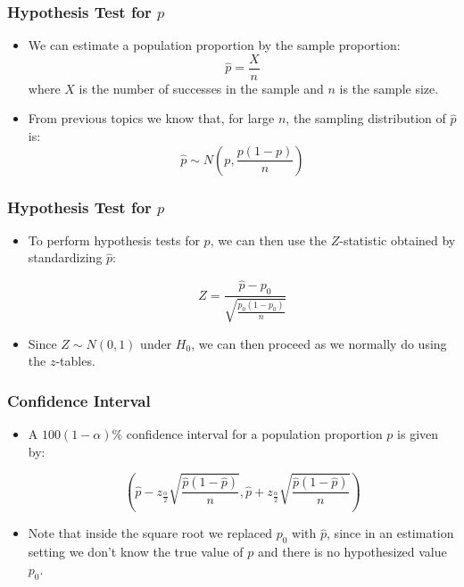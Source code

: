 \documentclass[14pt]{beamer}
\begin{document}
\begin{frame}
	\frametitle{Hypothesis Test for $p$}
	
	\begin{itemize}[label={\color{blue}$\blacktriangleright$}]
		\item We can estimate a population proportion by the sample proportion:
		\[
		\hat{p} = \frac{X}{n}
		\]
		where $X$ is the number of successes in the sample and $n$ is the sample size.
		
		\item From previous topics we know that, for large $n$, the sampling distribution of $\hat{p}$ is:
		\[
		\hat{p} \sim N\left(p, \frac{p(1-p)}{n}\right)
		\]
	\end{itemize}
	
\end{frame}
\begin{frame}
	\frametitle{Hypothesis Test for $p$}
	
	\begin{itemize}[label={\color{blue}$\blacktriangleright$}]
		\item To perform hypothesis tests for $p$, we can then use the $Z$-statistic obtained by standardizing $\hat{p}$:
		
		\[
		Z = \frac{\hat{p} - p_0}{\sqrt{\frac{p_0(1-p_0)}{n}}}
		\]
		
		\item Since $Z \sim N(0,1)$ under $H_0$, we can then proceed as we normally do using the $z$-tables.
	\end{itemize}
	
\end{frame}
\begin{frame}
	\frametitle{Confidence Interval}
	
	\begin{itemize}[label={\color{blue}$\blacktriangleright$}]
		\item A $100(1-\alpha)\%$ confidence interval for a population proportion $p$ is given by:
		
		\[
		\left(\hat{p} - z_{\frac{\alpha}{2}} \sqrt{\frac{\hat{p}(1-\hat{p})}{n}}, \hat{p} + z_{\frac{\alpha}{2}} \sqrt{\frac{\hat{p}(1-\hat{p})}{n}}\right)
		\]
		
		\item Note that inside the square root we replaced $p_0$ with $\hat{p}$, since in an estimation setting we don't know the true value of $p$ and there is no hypothesized value $p_0$.
	\end{itemize}
	
\end{frame}
\end{document}
